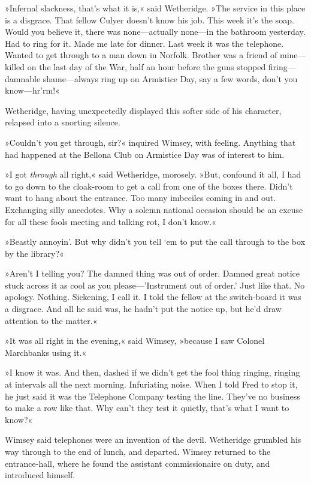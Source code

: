 »Infernal slackness, that's what it is,« said Wetheridge. »The service in this place is a disgrace. That fellow Culyer doesn't know his job. This week it's the soap. Would you believe it, there was none—actually none—in the bathroom yesterday. Had to ring for it. Made me late for dinner. Last week it was the telephone. Wanted to get through to a man down in Norfolk. Brother was a friend of mine—killed on the last day of the War, half an hour before the guns stopped firing—damnable shame—always ring up on Armistice Day, say a few words, don't you know—hr'rm!«

Wetheridge, having unexpectedly displayed this softer side of his character, relapsed into a snorting silence.

»Couldn't you get through, sir?« inquired Wimsey, with feeling. Anything that had happened at the Bellona Club on Armistice Day was of interest to him.

»I got \textit{through} all right,« said Wetheridge, morosely. »But, confound it all, I had to go down to the cloak-room to get a call from one of the boxes there. Didn't want to hang about the entrance. Too many imbeciles coming in and out. Exchanging silly anecdotes. Why a solemn national occasion should be an excuse for all these fools meeting and talking rot, I don't know.«

»Beastly annoyin'. But why didn't you tell `em to put the call through to the box by the library?«

»Aren't I telling you? The damned thing was out of order. Damned great notice stuck across it as cool as you please—'Instrument out of order.' Just like that. No apology. Nothing. Sickening, I call it. I told the fellow at the switch-board it was a disgrace. And all he said was, he hadn't put the notice up, but he'd draw attention to the matter.«

»It was all right in the evening,« said Wimsey, »because I saw Colonel Marchbanks using it.«

»I know it was. And then, dashed if we didn't get the fool thing ringing, ringing at intervals all the next morning. Infuriating noise. When I told Fred to stop it, he just said it was the Telephone Company testing the line. They've no business to make a row like that. Why can't they test it quietly, that's what I want to know?«

Wimsey said telephones were an invention of the devil. Wetheridge grumbled his way through to the end of lunch, and departed. Wimsey returned to the entrance-hall, where he found the assistant commissionaire on duty, and introduced himself.

